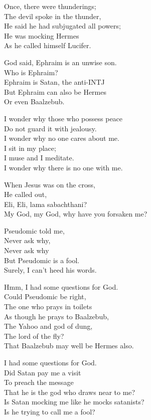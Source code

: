\documentclass[
]{book}
\begin{document}
Once, there were thunderings;\\
The devil spoke in the thunder,\\
He said he had subjugated all powers;\\
He was mocking Hermes\\
As he called himself Lucifer.

God said, Ephraim is an unwise son.\\
Who is Ephraim?\\
Ephraim is Satan, the anti-INTJ\\
But Ephraim can also be Hermes\\
Or even Baalzebub.

I wonder why those who possess peace\\
Do not guard it with jealousy.\\
I wonder why no one cares about me.\\
I sit in my place;\\
I muse and I meditate.\\
I wonder why there is no one with me.

When Jesus was on the cross,\\
He called out,\\
Eli, Eli, lama sabachthani?\\
My God, my God, why have you forsaken me?

Pseudomic told me,\\
Never ask why,\\
Never ask why\\
But Pseudomic is a fool.\\
Surely, I can't heed his words.

Hmm, I had some questions for God.\\
Could Pseudomic be right,\\
The one who prays in toilets\\
As though he prays to Baalzebub,\\
The Yahoo and god of dung,\\
The lord of the fly?\\
That Baalzebub may well be Hermes also.

I had some questions for God.\\
Did Satan pay me a visit\\
To preach the message\\
That he is the god who draws near to me?\\
Is Satan mocking me like he mocks satanists?\\
Is he trying to call me a fool?
\end{document}
